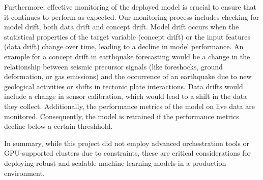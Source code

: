 Furthermore, effective monitoring of the deployed model is crucial to ensure
that it continues to perform as expected. Our monitoring process includes
checking for model drift, both data drift and concept drift. Model drift occurs
when the statistical properties of the target variable (concept drift) or the
input features (data drift) change over time, leading to a decline in model
performance. An example for a concept drift in earthquake forecasting would
be a change in the relationship between seismic precursor signals
(like foreshocks, ground deformation, or gas emissions) and the occurrence
of an earthquake due to new geological activities or shifts in tectonic plate
interactions. Data drifts would include a change in sensor calibration, which
would lead to a shift in the data they collect. Additionally, the performance
metrics of the model on live data are monitored. Consequently, the model is
retrained if the performance metrics decline below a certain threshhold.

In summary, while this project did not employ advanced orchestration tools
or GPU-supported clusters due to constraints, these are critical considerations
for deploying robust and scalable machine learning models in a production environment.
